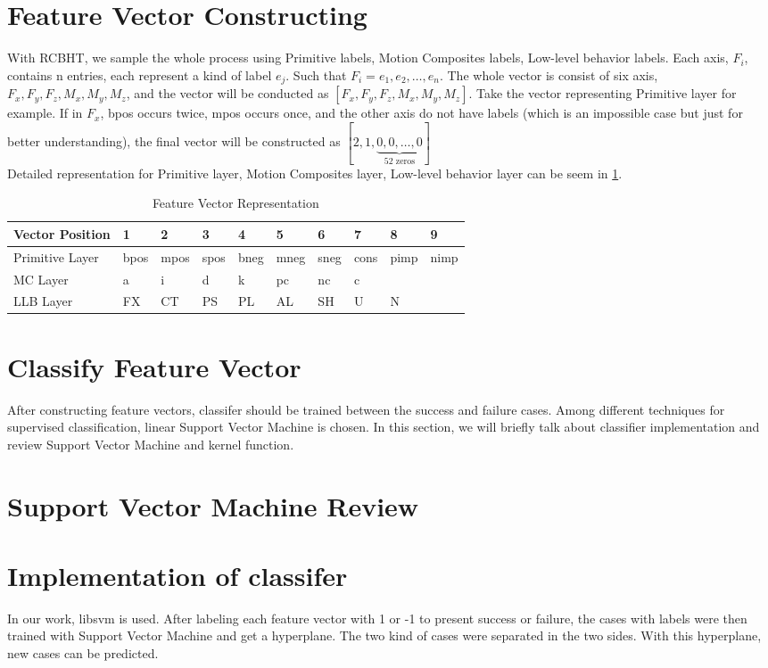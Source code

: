 \section{Feature Vector Constructing}
\indent With RCBHT, we sample the whole process using Primitive labels, Motion Composites labels, Low-level behavior labels. Each axis, $F_{i}$, contains n entries, each represent a kind of label $e_{j}$. Such that $F_{i} = {e_{1}, e_{2}, \dots , e_{n}}$. The whole vector is consist of six axis, $F_{x}, F_{y}, F_{z}, M_{x}, M_{y}, M_{z}$, and the vector will be conducted as $[F_{x}, F_{y}, F_{z}, M_{x}, M_{y}, M_{z}]$. Take the vector representing Primitive layer for example. If in $F_{x}$, bpos occurs twice, mpos occurs once, and the other axis do not have labels (which is an impossible case but just for better understanding), the final vector will be constructed as $[2, 1,\underbrace{0,0, \dots, 0}_\text{52 zeros}]$     \\
\indent Detailed representation for Primitive layer, Motion Composites layer, Low-level behavior layer can be seem in \ref{featureVector}.
\begin {table}[h]
\centering
\caption {Feature Vector Representation}
\label {featureVector}
\begin {tabular}{|llllllllll|}
\hline
Vector Position & 1     & 2     & 3     & 4     & 5     & 6     & 7     & 8     & 9     \\ \hline
Primitive Layer & bpos  & mpos  & spos  & bneg  & mneg  & sneg  & cons  & pimp  & nimp  \\ \hline
MC Layer        & a     & i     & d     & k     & pc    & nc    & c     &       &       \\ \hline
LLB Layer       & FX    & CT    & PS    & PL    & AL    & SH    & U     & N     &       \\ \hline
\end {tabular}
\end {table}

\section{Classify Feature Vector}
After constructing feature vectors, classifer should be trained between the success and failure cases. Among different techniques for supervised classification, linear Support Vector Machine is chosen. In this section, we will briefly talk about classifier implementation and review Support Vector Machine and kernel function.\\
\section{Support Vector Machine Review}

\section{Implementation of classifer}
\indent In our work, libsvm \cite{CC01a} is used. After labeling each feature vector with 1 or -1 to present success or failure, the cases with labels were then trained with Support Vector Machine and get a hyperplane. The two kind of cases were separated in the two sides. With this hyperplane, new cases can be predicted. \\
